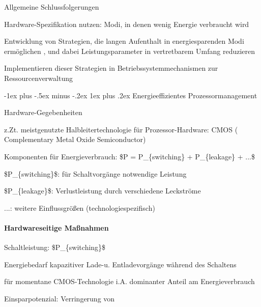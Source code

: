 \documentclass[a4paper]{article}
\makeatletter
\renewcommand{\subsubsection}{\@startsection{subsubsection}{3}{0mm}%
 {-1ex plus -.5ex minus -.2ex}%
 {1ex plus .2ex}%
 {\normalfont\small\bfseries}}
\makeatother
\begin{document}
\begin{multicols}{3}
    Allgemeine Schlussfolgerungen

    \begin{enumerate*}
        \item
        Hardware-Spezifikation nutzen: Modi, in denen wenig Energie verbraucht
        wird
        \item
        Entwicklung von Strategien, die langen Aufenthalt in energiesparenden
        Modi ermöglichen , und dabei Leistungsparameter in vertretbarem Umfang
        reduzieren
        \item
        Implementieren dieser Strategien in Betriebssystemmechanismen zur
        Ressourcenverwaltung
    \end{enumerate*}


    \subsubsection{Energieeffizientes
        Prozessormanagement}

    Hardware-Gegebenheiten

    \begin{itemize*}
        \item
        z.Zt. meistgenutzte Halbleitertechnologie für Prozessor-Hardware: CMOS
        ( Complementary Metal Oxide Semiconductor)
        \item
        Komponenten für Energieverbrauch: \$P = P\_\{switching\} +
        P\_\{leakage\} + ...\$
        \begin{itemize*}
            \item \$P\_\{switching\}\$: für Schaltvorgänge notwendige Leistung
            \item \$P\_\{leakage\}\$: Verlustleistung durch verschiedene Leckströme
            \item ...: weitere Einflussgrößen (technologiespezifisch)
        \end{itemize*}
    \end{itemize*}


    \paragraph{Hardwareseitige
        Maßnahmen}

    Schaltleistung: \$P\_\{switching\}\$

    \begin{itemize*}
        \item
        Energiebedarf kapazitiver Lade-u. Entladevorgänge während des
        Schaltens
        \item
        für momentane CMOS-Technologie i.A. dominanter Anteil am
        Energieverbrauch
        \item
        Einsparpotenzial: Verringerung von
        \begin{enumerate*}


\end{enumerate*}
\end{itemize*}
\end{multicols}
\end{document}
